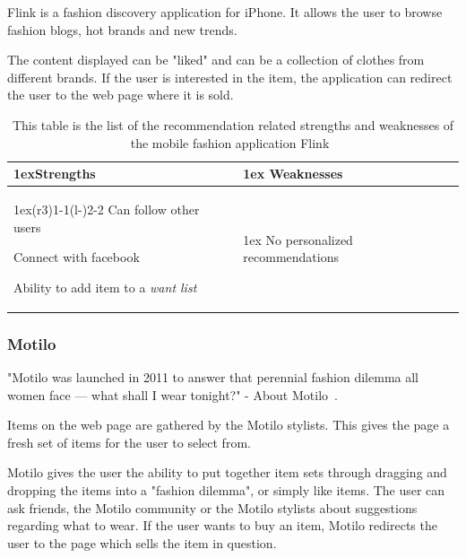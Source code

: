     Flink is a fashion discovery application for iPhone.
    It allows the user to browse fashion blogs, hot brands and new trends.

    The content displayed can be "liked" and can be a collection of clothes from different brands.
    If the user is interested in the item, the application can redirect the user to the web page where it is sold.
    \begin{table}[H]
            \centering
            \begin{tabularx}{\linewidth}{>{\parskip1ex}X@{\kern4\tabcolsep}>{\parskip1ex}X}
                \toprule
                \hfil\bfseries Strengths
                &
                \hfil\bfseries Weaknesses
                \\\cmidrule(r{3\tabcolsep}){1-1}\cmidrule(l{-\tabcolsep}){2-2}
                Can follow other users \par
                Connect with facebook \par
                Ability to add item to a \emph{want list} \par
                &
                No personalized recommendations \par
                \\\bottomrule
                \end{tabularx}
        \caption[Recommendation related strengths and weaknesses of Flink~\cite{flink}]{This table is the list of the recommendation related strengths and weaknesses of the mobile fashion application Flink~\cite{flink}}
        \label{table:iphoneAppFlink}
    \end{table}

\subsubsection{Motilo} %
\label{par:motilo}
    "Motilo was launched in 2011 to answer that perennial fashion dilemma all women face --- what shall I wear tonight?" - About Motilo~\cite{motilo}.

    Items on the web page are gathered by the Motilo stylists.
    This gives the page a fresh set of items for the user to select from.

    Motilo gives the user the ability to put together item sets through dragging and dropping the items into a "fashion dilemma", or simply like items.
    The user can ask friends, the Motilo community or the Motilo stylists about suggestions regarding what to wear.
    If the user wants to buy an item, Motilo redirects the user to the page which sells the item in question.

